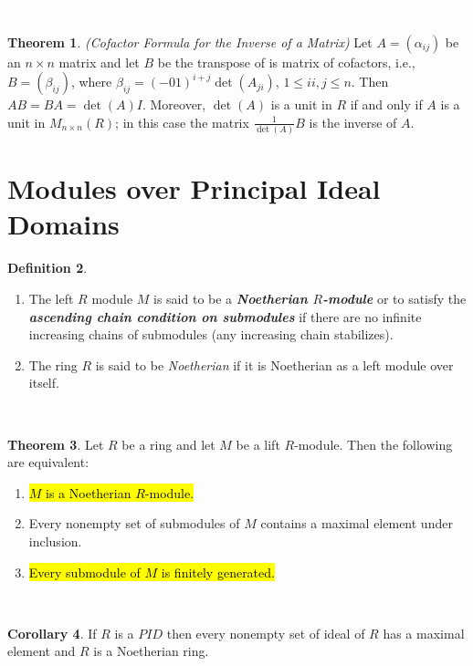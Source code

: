 \documentclass{article}
\theoremstyle{definition}
\newtheorem{thm}{Theorem}[section]
\newtheorem{cor}[thm]{Corollary}
\newtheorem{defn}[thm]{Definition}
\newcommand{\nl}{\textcolor{white}{nothing}}
\newcommand{\al}{\alpha}
\newcommand{\be}{\beta}
\begin{document}
\nl

\begin{thm}\textit{(Cofactor Formula for the Inverse of a Matrix)} Let $A = (\al_{ij})$ be an $n\times n$ matrix and let $B$ be the transpose of is matrix of cofactors, i.e., $B = (\be_{ij})$, where $\be_{ij} = (-01)^{i + j}\det(A_{ji})$, $1\leq ii,j\leq n$. Then $AB = BA = \det(A)I$. Moreover, $\det(A)$ is a unit in $R$ if and only if $A$ is a unit in $M_{n\times n}(R)$; in this case the matrix $\frac{1}{\det(A)} B$ is the inverse of $A$.
\end{thm}

\section{Modules over Principal Ideal Domains}
\setcounter{thm}{0}

\begin{defn}\nl
\begin{enumerate}
\item The left $R$ module $M$ is said to be a \textit{\textbf{Noetherian $R$-module}} or to satisfy the \textit{\textbf{ascending chain condition on submodules}} if there are no infinite increasing chains of submodules (any increasing chain stabilizes).
\item The ring $R$ is said to be \textit{Noetherian} if it is Noetherian as a left module over itself.
\end{enumerate}
\end{defn}

\nl

\begin{thm}
Let $R$ be a ring and let $M$ be a lift $R$-module. Then the following are equivalent:
\begin{enumerate}
\item \hl{$M$ is a Noetherian $R$-module.}
\item Every nonempty set of submodules of $M$ contains a maximal element under inclusion.
\item \hl{Every submodule of $M$ is finitely generated.}
\end{enumerate}
\end{thm}

\nl

\begin{cor}
If $R$ is a $PID$ then every nonempty set of ideal of $R$ has a maximal element and $R$ is a Noetherian ring.
\end{cor}
\end{document}
